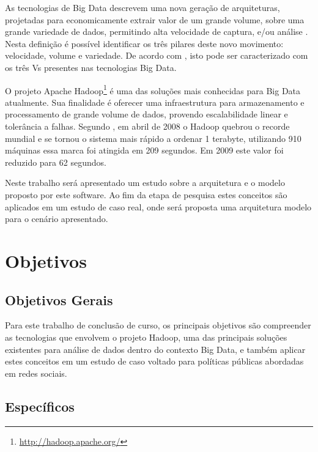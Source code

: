 As tecnologias de Big Data descrevem uma nova geração de arquiteturas, projetadas para economicamente extrair valor de um grande volume, sobre uma grande variedade de dados, permitindo alta velocidade de captura, e/ou análise \cite{gantz2011}. Nesta definição é possível identificar os três pilares deste novo movimento: velocidade, volume e variedade. De acordo com , isto pode ser caracterizado com os três Vs presentes nas tecnologias Big Data.

O projeto Apache Hadoop\footnote{\url{http://hadoop.apache.org/}} é uma das soluções mais conhecidas para Big Data atualmente. Sua finalidade é oferecer uma infraestrutura para armazenamento e processamento de grande volume de dados, provendo escalabilidade linear e tolerância a falhas. Segundo , em abril de 2008 o Hadoop quebrou o recorde mundial e se tornou o sistema mais rápido a ordenar 1 terabyte, utilizando 910 máquinas essa marca foi atingida em 209 segundos. Em 2009 este valor foi reduzido para 62 segundos. 

Neste trabalho será apresentado um estudo sobre a arquitetura e o modelo proposto por este software. Ao fim da etapa de pesquisa estes conceitos são aplicados em um estudo de caso real, onde será proposta uma arquitetura modelo para o cenário apresentado.

 
\section{Objetivos}

\subsection{Objetivos Gerais}
 
Para este trabalho de conclusão de curso, os principais objetivos são compreender as tecnologias que envolvem o projeto Hadoop, uma das principais soluções existentes para análise de dados dentro do contexto Big Data, e também aplicar estes conceitos em um estudo de caso voltado para políticas públicas abordadas em redes sociais.
 
 
 
\subsection{Específicos}
 
